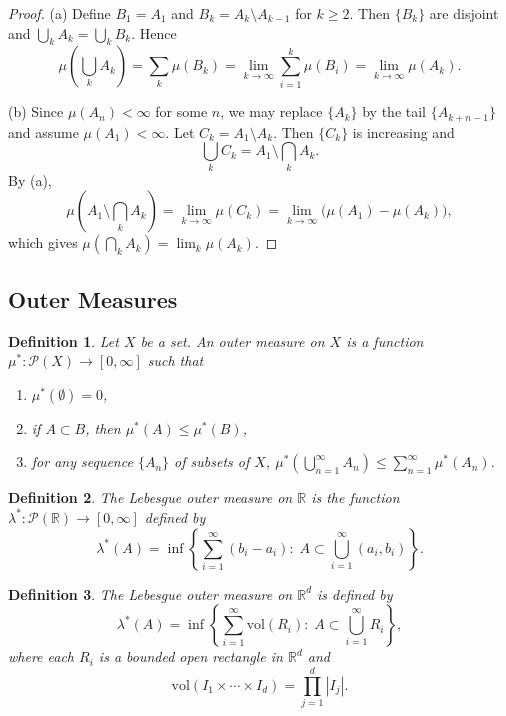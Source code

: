 \documentclass[12pt]{article}
\newtheorem{definition}{Definition}
\begin{document}
\begin{proof}
(a) Define $B_1 = A_1$ and $B_k = A_k \setminus A_{k-1}$ for $k \geq 2$.
Then $\{B_k\}$ are disjoint and $\bigcup_k A_k = \bigcup_k B_k$. Hence
\[
\mu\!\left(\bigcup_k A_k\right) = \sum_k \mu(B_k)
= \lim_{k \to \infty} \sum_{i=1}^k \mu(B_i)
= \lim_{k \to \infty} \mu(A_k).
\]

(b) Since $\mu(A_n) < \infty$ for some $n$, we may replace $\{A_k\}$ by the
tail $\{A_{k+n-1}\}$ and assume $\mu(A_1) < \infty$. Let $C_k = A_1 \setminus A_k$.
Then $\{C_k\}$ is increasing and
\[
\bigcup_k C_k = A_1 \setminus \bigcap_k A_k.
\]
By (a),
\[
\mu(A_1 \setminus \bigcap_k A_k) = \lim_{k \to \infty} \mu(C_k)
= \lim_{k \to \infty} \big(\mu(A_1) - \mu(A_k)\big),
\]
which gives $\mu(\bigcap_k A_k) = \lim_k \mu(A_k)$.
\end{proof}

\subsection*{Outer Measures}
\begin{definition}
Let $X$ be a set. An \emph{outer measure} on $X$ is a function
$\mu^* : \mathcal{P}(X) \to [0,\infty]$ such that
\begin{enumerate}[label=(\alph*)]
    \item $\mu^*(\emptyset) = 0$,
    \item if $A \subset B$, then $\mu^*(A) \le \mu^*(B)$,
    \item for any sequence $\{A_n\}$ of subsets of $X$,
    \(
    \mu^*\!\left(\bigcup_{n=1}^\infty A_n\right)
    \le \sum_{n=1}^\infty \mu^*(A_n).
    \)
\end{enumerate}
\end{definition}

\begin{definition}
The \emph{Lebesgue outer measure} on $\mathbb{R}$ is the function
$\lambda^* : \mathcal{P}(\mathbb{R}) \to [0,\infty]$ defined by
\[
\lambda^*(A)
= \inf \left\{
\sum_{i=1}^\infty (b_i - a_i)
:\;
A \subset \bigcup_{i=1}^\infty (a_i,b_i)
\right\}.
\]
\end{definition}

\begin{definition}
The \emph{Lebesgue outer measure} on $\mathbb{R}^d$ is defined by
\[
\lambda^*(A)
= \inf \left\{
\sum_{i=1}^\infty \mathrm{vol}(R_i)
:\;
A \subset \bigcup_{i=1}^\infty R_i
\right\},
\]
where each $R_i$ is a bounded open rectangle in $\mathbb{R}^d$ and
\[
\mathrm{vol}(I_1 \times \cdots \times I_d)
= \prod_{j=1}^d |I_j|.
\]
\end{definition}
\end{document}
